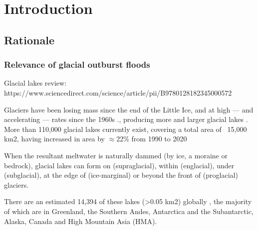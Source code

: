 \chapter{Introduction}
\label{ch:introduction}


\section{Rationale}

\subsection{Relevance of glacial outburst floods}

Glacial lakes review: https://www.sciencedirect.com/science/article/pii/B9780128182345000572

Glaciers have been losing mass since the end of the Little Ice, and at high — and accelerating — rates since the 1960s \cite{Huggonet2022,Zemp2019}., producing more and larger glacial lakes \cite{Zhang&al2024}. More than 110,000 glacial lakes currently exist, covering a total area of ~15,000 km2, having increased in area by $\approx$22\% from 1990 to 2020

When the resultant meltwater is naturally dammed (by ice, a moraine or bedrock), glacial lakes can form on (supraglacial), within (englacial), under (subglacial), at the edge of (ice-marginal) or beyond the front of (proglacial) glaciers. %

There are an estimated 14,394 of these lakes (>0.05 km2) globally \cite{Shugar&al2020}, the majority of which are in Greenland, the Southern Andes, Antarctica and the Subantarctic, Alaska, Canada and High Mountain Asia (HMA).

